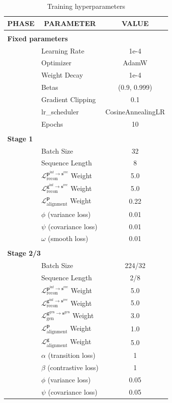\begin{table}[h]
\caption{Training hyperparameters}
\label{tab:training_hyperparameters}
\begin{center}
\begin{tabular}{llc}
\multicolumn{1}{c}{\bf PHASE} & \multicolumn{1}{c}{\bf PARAMETER} & \multicolumn{1}{c}{\bf VALUE}
\\ \hline \\
\multicolumn{3}{l}{\bf Fixed parameters} \\
& Learning Rate & 1e-4 \\
& Optimizer & AdamW \\
& Weight Decay & 1e-4 \\
& Betas & (0.9, 0.999) \\
& Gradient Clipping & 0.1 \\
& lr\_scheduler & CosineAnnealingLR \\
& Epochs & 10 \\
\\
\multicolumn{3}{l}{\bf Stage 1} \\
& Batch Size & 32 \\
& Sequence Length & 8 \\
& $\mathcal{L}_{\text{recon}}^{\boldsymbol{p}^{\text{inf}}\rightarrow \boldsymbol{s}^{\text{rec}}}$ Weight & 5.0 \\
& $\mathcal{L}_{\text{recon}}^{\boldsymbol{g}^{\text{inf}}\rightarrow \boldsymbol{s}^{\text{rec}}}$ Weight & 5.0 \\
& $\mathcal{L}_{\text{alignment}}^{\boldsymbol{p}}$ Weight & 0.22 \\
& $\phi$ (variance loss) & 0.01 \\
& $\psi$ (covariance loss) & 0.01 \\
& $\omega$ (smooth loss) & 0.01 \\
\\
\multicolumn{3}{l}{\bf Stage 2/3} \\
& Batch Size & 224/32 \\
& Sequence Length & 2/8 \\
& $\mathcal{L}_{\text{recon}}^{\boldsymbol{p}^{\text{inf}}\rightarrow \boldsymbol{s}^{\text{rec}}}$ Weight & 5.0 \\
& $\mathcal{L}_{\text{recon}}^{\boldsymbol{g}^{\text{inf}}\rightarrow \boldsymbol{s}^{\text{rec}}}$ Weight & 5.0 \\
& $\mathcal{L}_{\text{gen}}^{\boldsymbol{g}^{\text{gen}}\rightarrow \boldsymbol{s}^{\text{gen}}}$ Weight & 3.0 \\
& $\mathcal{L}_{\text{alignment}}^{\boldsymbol{p}}$ Weight & 1.0 \\
& $\mathcal{L}_{\text{alignment}}^{\boldsymbol{g}}$ Weight & 5.0 \\
& $\alpha$ (transition loss) & 1 \\
& $\beta$ (contrastive loss) & 1 \\
& $\phi$ (variance loss) & 0.05 \\
& $\psi$ (covariance loss) & 0.05 \\
\end{tabular}
\end{center}
\end{table}


